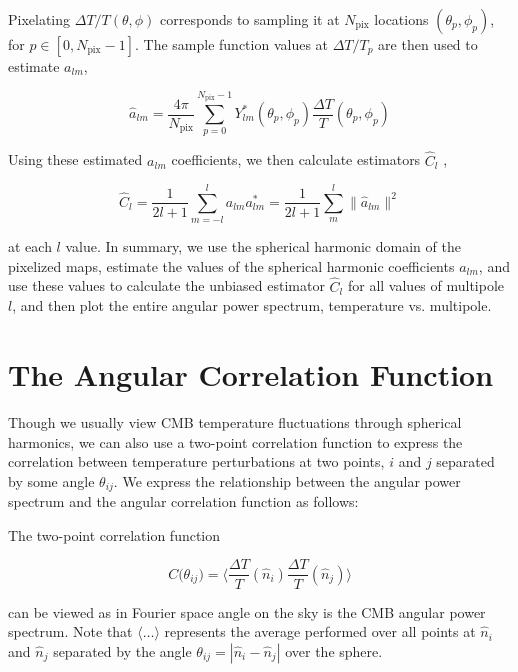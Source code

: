 \documentclass[12pt]{article}
\begin{document}
Pixelating $\Delta T/T(\theta, \phi)$ corresponds to sampling it at $N_{\mbox{pix}}$ locations $(\theta_p, \phi_p)$, for $p\in[0, N_{\mbox{pix}}-1]$. The sample function values at  $\Delta T/T_p$ are then used to estimate $a_{lm}$,

\begin{equation}
\hat{a}_{lm}=\frac{4\pi}{N_{\mbox{pix}}}\sum\limits^{ N_{\mbox{pix}}-1}_{p=0}Y^{*}_{lm}(\theta_p, \phi_p)\frac{\Delta T}{T}(\theta_p, \phi_p)
\end{equation}

Using these estimated $a_{lm}$ coefficients, we then calculate estimators $\hat{C}_l$ ,

\begin{equation}
\hat{C}_l = \frac{1}{2l+1}\sum\limits^{l}_{m=-l}a_{lm}a^{*}_{lm}=\frac{1}{2l+1}\sum\limits^{l}_{m}\|\hat{a}_{lm}\|^2
\end{equation}


at each $l$ value. In summary, we use the spherical harmonic domain of the pixelized maps, estimate the values of the spherical harmonic coefficients $a_{lm}$, and use these values to calculate the unbiased estimator $\hat{C}_l$ for all values of multipole $l$, and then plot the entire angular power spectrum, temperature vs. multipole.




\section{The Angular Correlation Function}

Though we usually view CMB temperature fluctuations through spherical harmonics, we can also use a two-point correlation function to express the correlation between temperature perturbations at two points, $i$ and $j$ separated by some angle $\theta_{ij}$. We express the relationship between the angular power spectrum and the angular correlation function as follows:


The two-point correlation function 

\begin{equation}
C\big(\theta_{ij}\big)=\langle \frac{\Delta T}{T}(\hat{n}_i)\frac{\Delta T}{T}(\hat{n}_j)\rangle
\end{equation}

can be viewed as in Fourier space angle on the sky is the CMB angular power spectrum. Note that $\langle\dots\rangle$ represents the average performed over all points at $\hat{n}_i$ and $\hat{n}_j$ separated by the angle $\theta_{ij}=|\hat{n}_i-\hat{n}_j|$ over the sphere. 
\end{document}
